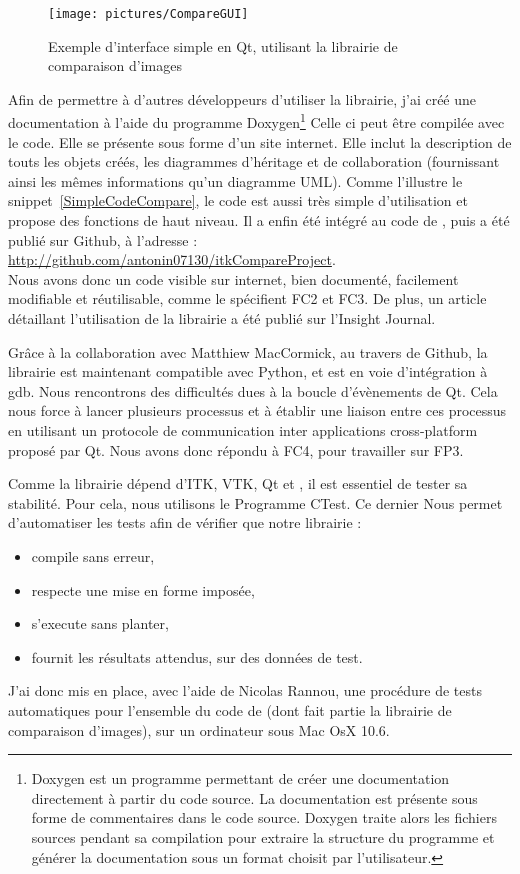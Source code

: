 \begin{figure}[h]
\begin{center}
\leavevmode
\texttt{[image: pictures/CompareGUI]}
\end{center}
\caption{Exemple d'interface simple en Qt, utilisant la librairie de comparaison d'images}
\label{fig:CompareGUI}
\end{figure}


Afin de permettre à d'autres développeurs d'utiliser la librairie,
j'ai créé une documentation à l'aide du programme Doxygen\footnote{Doxygen est un programme permettant de créer une documentation directement à partir du code source. La documentation est présente sous forme de commentaires dans le code source. Doxygen traite alors les fichiers sources pendant sa compilation pour extraire la structure du programme et générer la documentation sous un format choisit par l'utilisateur.} 
Celle ci peut être compilée avec le code.
Elle se présente sous forme d'un site internet.
Elle inclut la description de touts les objets créés, les diagrammes d'héritage et de collaboration
(fournissant ainsi les mêmes informations qu'un diagramme UML).
Comme l'illustre le snippet~\ref{SimpleCodeCompare}, le code est aussi très simple d'utilisation
et propose des fonctions de haut niveau.
Il a enfin été intégré au code de {\gofigure},
puis a été publié sur Github, à l'adresse :\\{\url{http://github.com/antonin07130/itkCompareProject}}.\\
Nous avons donc un code visible sur internet, bien documenté, facilement modifiable et réutilisable,
comme le spécifient FC2 et FC3.
De plus, un article\cite{AntoCompare} détaillant l'utilisation de la librairie a été publié sur l'Insight Journal.

Grâce à la collaboration avec Matthiew MacCormick, au travers de Github,
la librairie est maintenant compatible avec Python, et est en voie d'intégration à gdb.
Nous rencontrons des difficultés dues à la boucle d'évènements de Qt.
Cela nous force à lancer plusieurs processus et à établir une liaison entre
ces processus en utilisant un protocole de communication inter applications cross-platform proposé par Qt.
Nous avons donc répondu à FC4, pour travailler sur FP3.

Comme la librairie dépend d'ITK, VTK, Qt et {\gofigure}, il est essentiel de tester sa stabilité.
Pour cela, nous utilisons le Programme CTest.
Ce dernier Nous permet d'automatiser les tests afin de vérifier que notre librairie :
\begin{itemize}
  \item compile sans erreur,
  \item respecte une mise en forme imposée,
  \item s'execute sans planter,
  \item fournit les résultats attendus, sur des données de test.
\end{itemize}
J'ai donc mis en place, avec l'aide de Nicolas Rannou, une procédure de tests automatiques pour l'ensemble du code de {\gofigure} (dont fait partie la librairie de comparaison d'images), sur un ordinateur sous Mac OsX 10.6.

